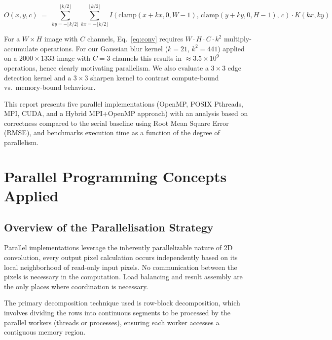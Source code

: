 ﻿\documentclass[12pt,a4paper]{article}
\begin{document}
\begin{equation}
  O(x,y,c) \;=\;
  \sum_{ky=-\lfloor k/2\rfloor}^{\lfloor k/2\rfloor}
  \sum_{kx=-\lfloor k/2\rfloor}^{\lfloor k/2\rfloor}
  I\!\left(\text{clamp}(x+kx,0,W{-}1),\,
           \text{clamp}(y+ky,0,H{-}1),\,c\right)
  \cdot K(kx,ky)
  \label{eq:conv}
\end{equation}

For a $W \times H$ image with $C$ channels, Eq.~\eqref{eq:conv} requires
$W \cdot H \cdot C \cdot k^2$ multiply-accumulate operations. For our Gaussian
blur kernel ($k=21$, $k^2=441$) applied on a $2000\!\times\!1333$ image with $C=3$
channels this results in $\approx\!3.5\times10^9$ operations, hence clearly motivating parallelism.
We also evaluate a $3\!\times\!3$ edge detection kernel and a $3\!\times\!3$ sharpen kernel to contrast compute-bound vs.\ memory-bound behaviour.

This report presents five parallel implementations (OpenMP, POSIX Pthreads, MPI, CUDA, and a Hybrid MPI+OpenMP approach) with an analysis based on correctness compared to the serial baseline using Root Mean Square Error (RMSE), and benchmarks execution time as a function of the degree of parallelism.

\section{Parallel Programming Concepts Applied}

\subsection{Overview of the Parallelisation Strategy}

Parallel implementations leverage the inherently parallelizable nature of 2D convolution, every output pixel calculation occurs independently based on its local neighborhood of  read-only input pixels. No communication between the pixels is necessary in the computation. Load balancing and result assembly are the only places where coordination is necessary.

The primary decomposition technique used is row-block decomposition, which involves 
dividing the rows into continuous segments to be processed by the parallel workers (threads or processes), ensuring each worker accesses a contiguous memory region.
\end{document}
